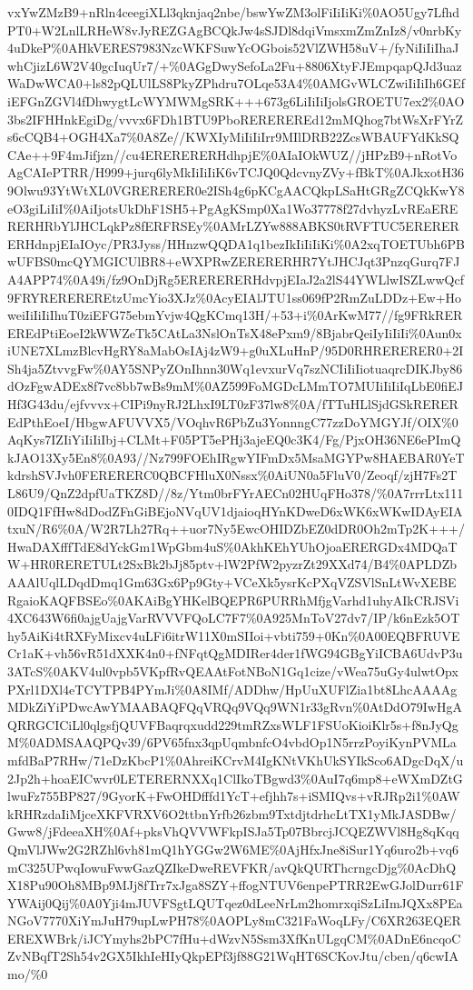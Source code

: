 \documentclass[]{article}
\begin{document}
vxYwZMzB9+nRln4ceegiXLl3qknjaq2nbe/bswYwZM3olFiIiIiKi\%0AO5Ugy7LfhdPT0+W2LnlLRHeW8vJyREZGAgBCQkJw4sSJDl8dqiVmsxmZmZnIz8/v0nrbKy4uDkeP\%0AHkVERES7983NzcWKFSuwYcOGbois52VlZWH58uV+/fyNiIiIiIhaJwhCjizL6W2V40gcIuqUr7/+\%0AGgDwySefoLa2Fu+8806XtyFJEmpqapQJd3uazWaDwWCA0+ls82pQLUlLS8PkyZPhdru7OLqe53A4\%0AMGvWLCZwiIiIiIh6GEfiEFGnZGVl4fDhwygtLcWYMWMgSRK+++673g6LiIiIiIjolsGROETU7ex2\%0AO3bs2IFHHnkEgiDg/vvvx6FDh1BTU9PboREREREREd12mMQhog7btWsXrFYrZs6cCQB4+OGH4Xa7\%0A8Ze//KWXIyMiIiIiIrr9MIlDRB22ZcsWBAUFYdKkSQCAe++9F4mJifjzn//cu4ERERERERHdhpjE\%0AIaIOkWUZ//jHPzB9+nRotVoAgCAIePTRR/H999+jurq6lyMkIiIiIiK6vTCJQ0QdcvnyZVy+fBkT\%0AJkxotH369Olwu93YtWtXL0VGRERERER0e2ISh4g6pKCgAACQkpLSaHtGRgZCQkKwY8eO3giLiIiI\%0AiIjotsUkDhF1SH5+PgAgKSmp0Xa1Wo37778f27dvhyzLvREaERERERHRbYlJHCLqkPz8fERFRSEy\%0AMrLZYw888ABKS0tRVFTUC5ERERERERHdnpjEIaIOyc/PR3Jyss/HHnzwQQDA1q1bezIkIiIiIiKi\%0A2xqTOETUbh6PBwUFBS0mcQYMGICUlBR8+eWXPRwZERERERHR7YtJHCJqt3PnzqGurq7FJA4APP74\%0A49i/fz9OnDjRg5ERERERERHdvpjEIaJ2a2lS44YWLlwISZLwwQcf9FRYREREREREtzUmcYio3XJz\%0AcyEIAlJTU1ss069fP2RmZuLDDz+Ew+HoweiIiIiIiIhuT0ziEFG75ebmYvjw4QgKCmq13H/+53+i\%0ArKwM77//fg9FRkREREREdPtiEoeI2kWWZeTk5CAtLa3NslOnTsX48ePxm9/8BjabrQeiIyIiIiIi\%0Aun0xiUNE7XLmzBlcvHgRY8aMabOsIAj4zW9+g0uXLuHnP/95D0RHRERERER0+2ISh4ja5ZtvvgFw\%0AY5SNPyZOnIhnn30Wq1evxurVq7szNCIiIiIiotuaqrcDIKJby86dOzFgwADEx8f7vc8bb7wBs9mM\%0AZ599FoMGDcLMmTO7MUIiIiIiIqLbE0fiEJHf3G43du/ejfvvvx+CIPi9nyRJ2LhxI9LT0zF37lw8\%0A/fTTuHLlSjdGSkREREREdPthEoeI/HbgwAFUVVX5/VOqhvR6PbZu3YonnngC77zzDoYMGYJf/OIX\%0AqKys7IZIiYiIiIiIbj+CLMt+F05PT5ePHj3ajeEQ0c3K4/Fg/PjxOH36NE6ePImQkJAO13Xy5En8\%0A93//Nz799FOEhIRgwYIFmDx5MsaMGYPw8HAEBAR0YeTkdrshSVJvh0FERERERC0QBCFHluX0Nssx\%0AiUN0a5FluV0/Zeoqf/zjH7Fs2TL86U9/QnZ2dpfUaTKZ8D//8z/Ytm0brFYrAECn02HUqFHo378/\%0A7rrrLtx1110IDQ1FfHw8dDodZFnGiBEjoNVqUV1djaioqHYnKDweD6xWK6xWKwIDAyEIAtxuN/R6\%0A/W2R7Lh27Rq++uor7Ny5EwcOHIDZbEZ0dDR0Oh2mTp2K+++/HwaDAXfffTdE8dYckGm1WpGbm4uS\%0AkhKEhYUhOjoaERERGDx4MDQaTW+HR0RERETULt2SxBk2bJj85ptv+lW2PfW2pyzrZt29XXd74/B4\%0APLDZbAAAlUqlLDqdDmq1Gm63Gx6Pp9Gty+VCeXk5ysrKcPXqVZSVlSnLtWvXEBERgaioKAQFBSEo\%0AKAiBgYHKelBQEPR6PURRhMfjgVarhd1uhyAIkCRJSVi4XC643W6fi0ajgUajgVarRVVVFQoLC7F7\%0A925MnToV27dv7/IP/k6nEzk5OThy5AiKi4tRXFyMixcv4uLFi6itrW11X0mSIIoi+vbti759+0Kn\%0A00EQBFRUVECr1aK+vh56vR51dXXK4n0+fNFqtQgMDIRer4der1fWG94GBgYiICBA6UdvP3u3ATcS\%0AKV4ul0vpb5VKpfRvQEAAtFotNBoN1Gq1cize/vWea75uGy4ulwtOpxPXrl1DXl4eTCYTPB4PYmJi\%0A8IMf/ADDhw/HpUuXUFlZia1bt8LhcAAAAgMDkZiYiPDwcAwYMAABAQFQqVRQq9VQq9WN1r33gRvn\%0AtDdO79IwHgAQRRGCICiLl0qlgsfjQUVFBaqrqxudd229tmRZxsWLF1FSUoKioiKlr5s+f8nJyQgM\%0ADMSAAQPQv39/6PV65fnx3qpUqmbnfcO4vbdOp1N5rrzPoyiKynPVMLamfdBaP7RHw/71eDzKbcP1\%0AhreiKCrvM4IgKNtVKhUkSYIkSco6ADgcDqX/u2Jp2h+hoaEICwvr0LETERERNXXq1ClIkoTBgwd3\%0AuI7q6mp8+eWXmDZtGlwuFz755BP827/9GyorK+FwOHDfffd1YcT+efjhh7s+iSMIQvs+vRJRp2i1\%0AWkRHRzdaIiMjceXKFVRXV6O2ttbnYrfb26zbm9TxtdjtdrhcLtTX1yMkJASDBw/Gww8/jFdeeaXH\%0Af+pksVhQVVWFkpISJa5Tp07BbrcjJCQEZWVl8Hg8qKqqQmVlJWw2G2RZhl6vh81mQ1hYGGw2W6ME\%0AjHfxJne8iSur1Yq6uro2b+vq6mC325UPwqIowuFwwGazQZIkeDweREVFKR/avQkQURThcrngcDjg\%0AcDhQX18Pu90Oh8MBp9MJj8fTrr7xJga8SZY+ffogNTUV6enpePTRR2EwGJolDurr61FYWAij0Qij\%0A0Yji4mJUVFSgtLQUTqez0dLeeNrLm2homrxqiSzLiImJQXx8PEaNGoV7770XiYmJuH79upLwPH78\%0AOPLy8mC321FaWoqLFy/C6XR263EQEREREXWBrk/iJCYmyhs2bPC7fHu+dWzvN5Ssm3XfKnULgqCM\%0ADnE6ncqoCZvNBqfT2Sh54v2GX5IkhIeHIyQkpEPf3jf88G21WqHT6SCKovJtu/cben/q6cwIAmo/\%0
\end{document}

